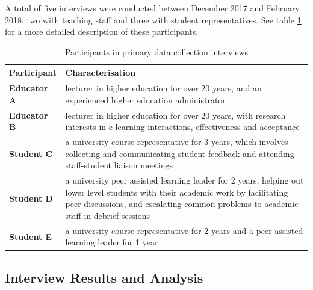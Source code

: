 A total of five interviews were conducted between December 2017 and February 2018:
two with teaching staff and three with student representatives. See table
\ref{table:participants-req} for a more detailed description of these participants.

\begin{table}[!h]
	\caption{Participants in primary data collection interviews}
	\centering
	\label{table:participants-req}
	\begin{tabularx}{\textwidth}{>{\bfseries}lX}
		Participant & Characterisation                                                                    \\
		\toprule
		Educator A  & lecturer in higher education for over 20 years, and an experienced higher education
		administrator                                                                                     \\\midrule
		Educator B  & lecturer in higher education for over 20 years, with research interests
		in e-learning interactions, effectiveness and acceptance                                          \\\midrule
		Student C   & a university course representative for 3 years, which involves collecting and
		communicating student feedback and attending staff-student liaison meetings                       \\\midrule
		Student D   & a university peer assisted learning leader for 2 years, helping out lower level
		students with their academic work by facilitating peer discussions, and escalating common problems
		to academic staff in debrief sessions                                                             \\\midrule
		Student E   & a university course representative for 2 years and a peer assisted learning leader
		for 1 year                                                                                        \\\bottomrule
	\end{tabularx}
\end{table}

\subsection{Interview Results and Analysis}


